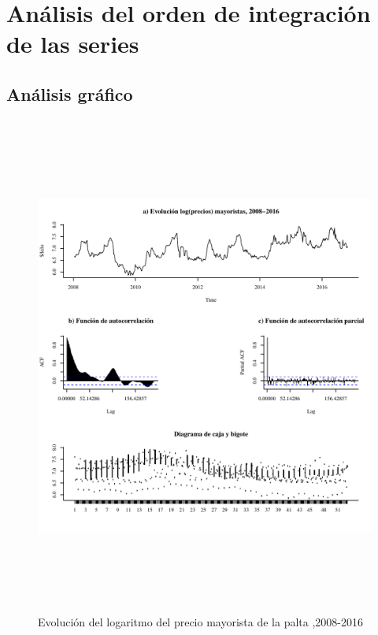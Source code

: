 \documentclass[12pt, twoside]{book}\usepackage[]{graphicx}\usepackage[]{color}
\newenvironment{knitrout}{}{} %
\numberwithin{equation}{section}
\numberwithin{theorem}{section}
\numberwithin{teorema}{section}
\numberwithin{defi}{section}
\numberwithin{prop}{section}
\numberwithin{defi}{section}
\theoremstyle{plain}
\begin{document}
\section{Análisis del orden de integración de las series}
\subsection{Análisis gráfico}

\begin{knitrout}
\color{fgcolor}\begin{figure}[H]

{\centering \includegraphics[width=6in,height=6.5in]{figure/fig-2_1-1} 

}

\caption[Evolución del logaritmo del precio mayorista de la palta ,2008-2016]{Evolución del logaritmo del precio mayorista de la palta ,2008-2016}\label{fig:fig-2.1}
\end{figure}


\end{knitrout}
\end{document}
